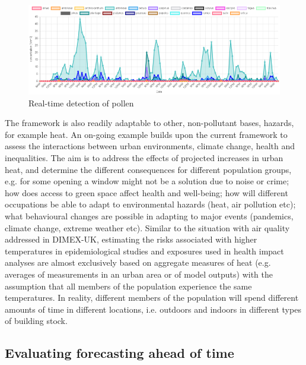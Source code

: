 \documentclass{article}
\begin{document}
\begin{figure}
	\centering
	\includegraphics[width=0.95\linewidth]{Figures/poleno_firs.width-800.png}
	\caption{Real-time detection of pollen} \label{fig::pollen}
\end{figure}

\noindent The framework is also readily adaptable to other, non-pollutant bases, hazards, for example heat. An on-going example builds upon the current framework  to assess the interactions between urban environments, climate change, health and inequalities. The aim is to address the effects of projected increases in urban heat, and determine the different consequences for different population groups, e.g. for some opening a window might not be a solution due to noise or crime; how does access to green space affect health and well-being; how will different occupations be able to adapt to environmental hazards (heat, air pollution etc); what behavioural changes are possible in adapting to major events (pandemics, climate change, extreme weather etc). Similar to the situation with air quality addressed in DIMEX-UK, estimating the risks associated with higher temperatures in epidemiological studies and exposures used in health impact analyses are almost exclusively based on aggregate measures of heat (e.g. averages of measurements in an urban area or of model outputs) with the assumption that all members of the population experience the same temperatures. In reality, different members of the population will spend different amounts of time in different locations, i.e. outdoors and indoors in different types of building stock.

\clearpage
\subsection{Evaluating forecasting ahead of time}

\end{document}
